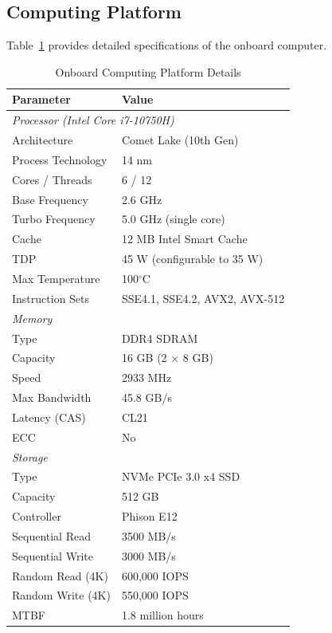 \clearpage

\subsection{Computing Platform}

Table~\ref{tab:compute_platform} provides detailed specifications of the onboard computer.

\begin{table}[htbp]
\centering
\caption{Onboard Computing Platform Details}
\label{tab:compute_platform}
\begin{tabular}{@{}ll@{}}
\toprule
\textbf{Parameter} & \textbf{Value} \\
\midrule
\multicolumn{2}{l}{\textit{Processor (Intel Core i7-10750H)}} \\
Architecture & Comet Lake (10th Gen) \\
Process Technology & 14 nm \\
Cores / Threads & 6 / 12 \\
Base Frequency & 2.6 GHz \\
Turbo Frequency & 5.0 GHz (single core) \\
Cache & 12 MB Intel Smart Cache \\
TDP & 45 W (configurable to 35 W) \\
Max Temperature & 100$^\circ$C \\
Instruction Sets & SSE4.1, SSE4.2, AVX2, AVX-512 \\
\midrule
\multicolumn{2}{l}{\textit{Memory}} \\
Type & DDR4 SDRAM \\
Capacity & 16 GB (2 $\times$ 8 GB) \\
Speed & 2933 MHz \\
Max Bandwidth & 45.8 GB/s \\
Latency (CAS) & CL21 \\
ECC & No \\
\midrule
\multicolumn{2}{l}{\textit{Storage}} \\
Type & NVMe PCIe 3.0 x4 SSD \\
Capacity & 512 GB \\
Controller & Phison E12 \\
Sequential Read & 3500 MB/s \\
Sequential Write & 3000 MB/s \\
Random Read (4K) & 600,000 IOPS \\
Random Write (4K) & 550,000 IOPS \\
MTBF & 1.8 million hours \\

\end{tabular}
\end{table}
